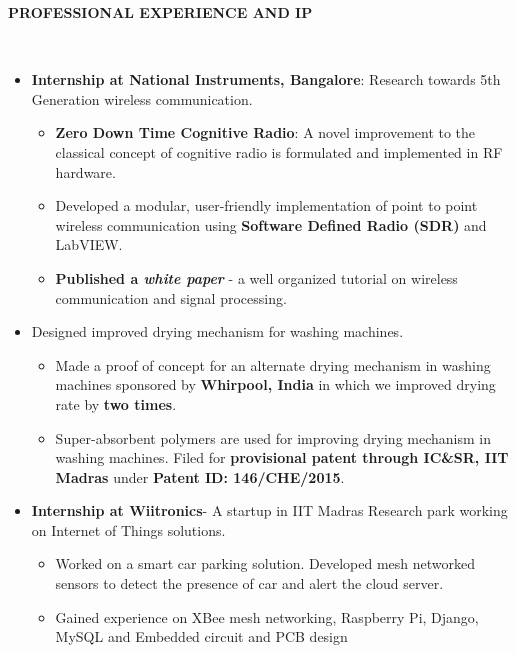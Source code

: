 \documentclass[a4paper,10pt]{article}
\newcommand{\lsep}{-0.5cm}
\newcommand{\resheading}[1]{{\small \colorbox{mygrey}{\begin{minipage}{0.975\textwidth}{\textbf{#1 \vphantom{p\^{E}}}}\end{minipage}}}}
\begin{document}
\resheading{\textbf{PROFESSIONAL EXPERIENCE AND IP} }\\[\lsep]
    \begin{itemize}
            \item \textbf{Internship at National Instruments, Bangalore}: Research towards 5th Generation wireless communication.
        \begin{itemize}
            \vspace{-5pt}
            \item \textbf{Zero Down Time Cognitive Radio}: A novel improvement to the classical concept of cognitive radio is formulated and implemented in RF hardware.
            \item Developed a modular, user-friendly implementation of point to point wireless communication using \textbf{Software Defined Radio (SDR)} and LabVIEW.
            \item \textbf{Published a \textit{white paper}} - a well organized tutorial on wireless communication and signal processing.
        \end{itemize}
        \vspace{-5pt}
        \item Designed improved drying mechanism for washing machines.
        \begin{itemize}
            \vspace{-5pt}
            \item Made a proof of concept for an alternate drying mechanism in washing machines sponsored by \textbf{Whirpool, India} in which we improved drying rate by \textbf{two times}.
            \item Super-absorbent polymers are used for improving drying mechanism in washing machines. Filed for \textbf{provisional patent through IC\&SR, IIT Madras} under \textbf{Patent ID: 146/CHE/2015}.
        \end{itemize}
        \vspace{-5pt}
        \item \textbf{Internship at Wiitronics}- A startup in IIT Madras Research park working on Internet of Things solutions.
        \vspace{-5pt}
        \begin{itemize}
            \setlength{\itemsep}{1pt}
            \item Worked on a smart car parking solution. Developed mesh networked sensors to detect the presence of car and alert the cloud server.
            \item Gained experience on XBee mesh networking, Raspberry Pi, Django, MySQL and Embedded circuit and PCB design
        \end{itemize}
    \end{itemize}
\end{document}
